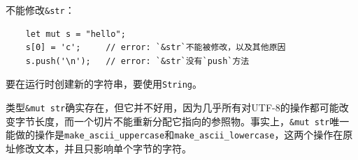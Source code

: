 不能修改\texttt{\&str}：
\begin{verbatim}
    let mut s = "hello";
    s[0] = 'c';     // error: `&str`不能被修改，以及其他原因
    s.push('\n');   // error: `&str`没有`push`方法
\end{verbatim}

要在运行时创建新的字符串，要使用\texttt{String}。

类型\texttt{\&mut str}确实存在，但它并不好用，因为几乎所有对UTF-8的操作都可能改变字节长度，而一个切片不能重新分配它指向的参照物。事实上，\texttt{\&mut str}唯一能做的操作是\texttt{make\_ascii\_uppercase}和\texttt{make\_ascii\_lowercase}，这两个操作在原址修改文本，并且只影响单个字节的字符。















